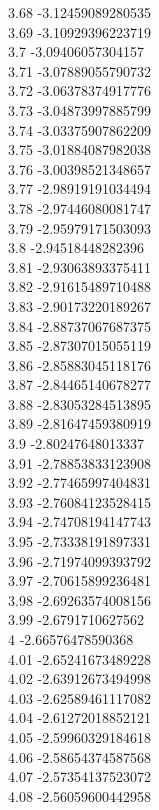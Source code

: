{3.68	-3.12459089280535\\
3.69	-3.10929396223719\\
3.7	-3.09406057304157\\
3.71	-3.07889055790732\\
3.72	-3.06378374917776\\
3.73	-3.04873997885799\\
3.74	-3.03375907862209\\
3.75	-3.01884087982038\\
3.76	-3.00398521348657\\
3.77	-2.98919191034494\\
3.78	-2.97446080081747\\
3.79	-2.95979171503093\\
3.8	-2.94518448282396\\
3.81	-2.93063893375411\\
3.82	-2.91615489710488\\
3.83	-2.90173220189267\\
3.84	-2.88737067687375\\
3.85	-2.87307015055119\\
3.86	-2.85883045118176\\
3.87	-2.84465140678277\\
3.88	-2.83053284513895\\
3.89	-2.81647459380919\\
3.9	-2.80247648013337\\
3.91	-2.78853833123908\\
3.92	-2.77465997404831\\
3.93	-2.76084123528415\\
3.94	-2.74708194147743\\
3.95	-2.73338191897331\\
3.96	-2.71974099393792\\
3.97	-2.70615899236481\\
3.98	-2.69263574008156\\
3.99	-2.6791710627562\\
4	-2.66576478590368\\
4.01	-2.65241673489228\\
4.02	-2.63912673494998\\
4.03	-2.62589461117082\\
4.04	-2.61272018852121\\
4.05	-2.59960329184618\\
4.06	-2.58654374587568\\
4.07	-2.57354137523072\\
4.08	-2.56059600442958\\
}
